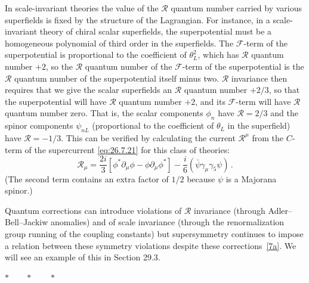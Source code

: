 In scale-invariant theories the value of the \(\mathcal{R}\) quantum number
carried by various superfields is fixed by the structure of the Lagrangian.
For instance, in a scale-invariant theory of chiral scalar superfields, the
superpotential must be a homogeneous polynomial of third order in the
superfields. The \(\mathcal{F}\)-term of the superpotential is proportional
to the coefficient of \(\theta_L^2\), which has \(\mathcal{R}\) quantum
number \(+2\), so the \(\mathcal{R}\) quantum number of the
\(\mathcal{F}\)-term of the superpotential is the \(\mathcal{R}\) quantum
number of the superpotential itself minus two. \(\mathcal{R}\) invariance
then requires that we give the scalar superfields an \(\mathcal{R}\) quantum
number \(+2/3\), so that the superpotential will have \(\mathcal{R}\)
quantum number \(+2\), and its \(\mathcal{F}\)-term will have
\(\mathcal{R}\) quantum number zero. That is, the scalar components \(\phi_n\)
have \(\mathcal{R}=2/3\) and the spinor components \(\psi_{nL}\)
(proportional to the coefficient of \(\theta_L\) in the superfield) have
\(\mathcal{R}=-1/3\). This can be verified by calculating the current
\(\mathcal{R}^\mu\) from the \(C\)-term of the supercurrent
\eqref{eq:26.7.21} for this class of theories:
\begin{equation}
  \mathcal{R}_\mu
  =\frac{2i}{3}
    [\phi^*\partial_\mu\phi-\phi\partial_\mu\phi^*]
   -\frac{i}{6}(\bar\psi\gamma_\mu\gamma_5\psi)\,.
  \tag{26.7.52}\label{eq:26.7.52}
\end{equation}
(The second term contains an extra factor of \(1/2\) because \(\psi\) is a
Majorana spinor.)

Quantum corrections can introduce violations of \(\mathcal{R}\) invariance
(through Adler--Bell--Jackiw anomalies) and of scale invariance (through the
renormalization group running of the coupling constants) but supersymmetry
continues to impose a relation between these symmetry violations despite
these corrections~\hyperref[ch26-ref-7a]{[7a]}. We will see an example of
this in Section 29.3.

\begin{center}
\(\ast\qquad\ast\qquad\ast\)
\end{center}

